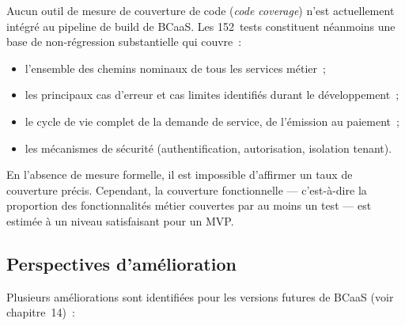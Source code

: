 Aucun outil de mesure de couverture de code (\textit{code coverage}) n'est actuellement
intégré au pipeline de build de BCaaS. Les 152~tests constituent néanmoins une base de
non-régression substantielle qui couvre~:

\begin{itemize}
  \item l'ensemble des chemins nominaux de tous les services métier~;
  \item les principaux cas d'erreur et cas limites identifiés durant le développement~;
  \item le cycle de vie complet de la demande de service, de l'émission au paiement~;
  \item les mécanismes de sécurité (authentification, autorisation, isolation tenant).
\end{itemize}

En l'absence de mesure formelle, il est impossible d'affirmer un taux de couverture précis.
Cependant, la couverture fonctionnelle --- c'est-à-dire la proportion des fonctionnalités
métier couvertes par au moins un test --- est estimée à un niveau satisfaisant pour un MVP.

\subsection{Perspectives d'amélioration}
\label{subsec:couverture-perspectives}

Plusieurs améliorations sont identifiées pour les versions futures de BCaaS (voir
chapitre~14)~:

